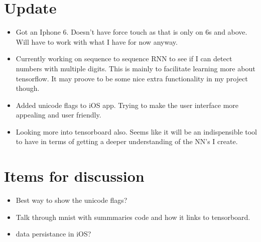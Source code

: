 \documentclass[]{weekly-report}
\begin{document}

\def\studentname{Philip Corr}
\def\projecttitle{ConvNets for iOS Gesture Recognition Applications}
\def\ucdstudentnumber{12318581}
\def\weeklyreportnumber{5}
\maketitle


\section{Update}

\begin{itemize}

\item Got an Iphone 6. Doesn't have force touch as that is only on 6s and above. Will have to work with what I have for now anyway.

\item Currently working on sequence to sequence RNN to see if I can detect numbers with multiple digits. This is mainly to facilitate learning more about tensorflow. It may proove to be some nice extra functionality in my project though.

\item Added unicode flags to iOS app. Trying to make the user interface more appealing and user friendly. 

\item Looking more into tensorboard also. Seems like it will be an indispensible tool to have in terms of getting a deeper understanding of the NN's I create.  
	
\end{itemize}

\section{Items for discussion}

\begin{itemize}

\item Best way to show the unicode flags?

\item Talk through mnist with summmaries code and how it links to tensorboard.

\item data persistance in iOS?

\end{itemize}
\end{document}
